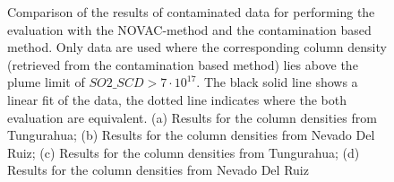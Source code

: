 \documentclass  [
  paper    = a4,
  BCOR     = 10mm,
  twoside,
  fontsize = 12pt,
  fleqn,
  toc      = bibnumbered,
  toc      = listofnumbered,
  numbers  = noendperiod,
  headings = normal,
  listof   = leveldown,
  version  = 3.03
]                                       {scrreprt}
\begin{document}
\begin{figure}[h!]
{		\label{fig:diffNovacd}}
		\caption{Comparison of the results of contaminated data for performing the evaluation with the NOVAC-method and the contamination based method. Only data are used where the corresponding   column density (retrieved from the contamination based method) lies above the plume limit of $SO2\_SCD>7\cdot 10^{17}$. The black solid line shows a linear fit of the data, the dotted line indicates where the both evaluation are equivalent. (a) Results for the   column densities from Tungurahua; (b) Results for the   column densities from Nevado Del Ruiz; (c) Results for the   column densities from Tungurahua; (d) Results for the   column densities from Nevado Del Ruiz}
		\label{fig:diffNovac}
	\end{figure}
\begin{figure}[h!]		
\end{figure}
\end{document}
